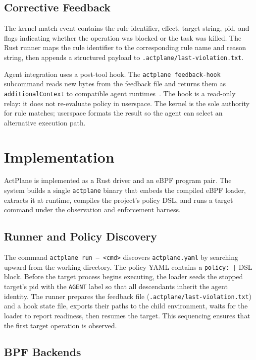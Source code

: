 \subsection{Corrective Feedback}

The kernel match event contains the rule identifier, effect, target
string, pid, and flags indicating whether the operation was blocked or the
task was killed. The Rust runner maps the rule identifier to the
corresponding rule name and reason string, then appends a
structured payload to \texttt{.actplane/last-violation.txt}.

Agent integration uses a post-tool hook. The \texttt{actplane feedback-hook}
subcommand reads new bytes from the feedback file and returns them as
\texttt{additionalContext} to compatible agent
runtimes~\cite{agentsight}. The hook is a read-only relay: it does not
re-evaluate policy in userspace. The kernel is the sole authority for rule
matches; userspace formats the result so the agent can select an alternative
execution path.


\section{Implementation}
\label{sec:implementation}

ActPlane is implemented as a Rust driver and an eBPF program pair. The
system builds a single \texttt{actplane} binary that embeds the compiled
eBPF loader, extracts it at runtime, compiles the project's policy DSL,
and runs a target command under the observation and enforcement harness.

\subsection{Runner and Policy Discovery}

The command \texttt{actplane run -- <cmd>} discovers
\texttt{actplane.yaml} by searching upward from the working directory.
The policy YAML contains a \texttt{policy:~|} DSL block. Before the
target process begins executing, the loader seeds the stopped target's pid
with the \texttt{AGENT} label so that all descendants inherit the agent
identity. The runner prepares the feedback file
(\texttt{.actplane/last-violation.txt}) and a hook state file, exports
their paths to the child environment, waits for the loader to report
readiness, then resumes the target. This sequencing ensures that the
first target operation is observed.

\subsection{BPF Backends}

